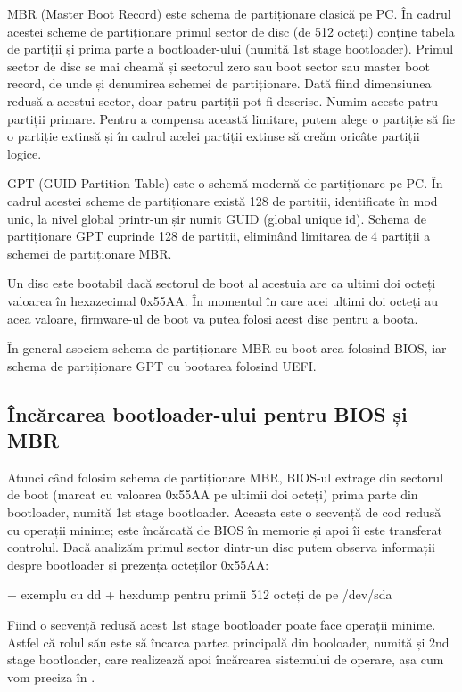MBR (Master Boot Record) este schema de partiționare clasică pe PC. În cadrul
acestei scheme de partiționare primul sector de disc (de 512 octeți) conține
tabela de partiții și prima parte a bootloader-ului (numită 1st stage
bootloader). Primul sector de disc se mai cheamă și sectorul zero sau boot
sector sau master boot record, de unde și denumirea schemei de partiționare.
Dată fiind dimensiunea redusă a acestui sector, doar patru partiții pot fi
descrise. Numim aceste patru partiții primare. Pentru a compensa această
limitare, putem alege o partiție să fie o partiție extinsă și în cadrul acelei
partiții extinse să creăm oricâte partiții logice.

GPT (GUID Partition Table) este o schemă modernă de partiționare pe PC. În
cadrul acestei scheme de partiționare există 128 de partiții, identificate în
mod unic, la nivel global printr-un șir numit GUID (global unique id). Schema de
partiționare GPT cuprinde 128 de partiții, eliminând limitarea de 4 partiții a
schemei de partiționare MBR.

Un disc este bootabil dacă sectorul de boot al acestuia are ca ultimi doi octeți
valoarea în hexazecimal 0x55AA. În momentul în care acei ultimi doi octeți au
acea valoare, firmware-ul de boot va putea folosi acest disc pentru a boota.

În general asociem schema de partiționare MBR cu boot-area folosind BIOS, iar
schema de partiționare GPT cu bootarea folosind UEFI.

\subsection{Încărcarea bootloader-ului pentru BIOS și MBR}
\label{sec:boot-bootdev-bootmbr}

Atunci când folosim schema de partiționare MBR, BIOS-ul extrage din sectorul de
boot (marcat cu valoarea 0x55AA pe ultimii doi octeți) prima parte din
bootloader, numită 1st stage bootloader. Aceasta este o secvență de cod redusă
cu operații minime; este încărcată de BIOS în memorie și apoi îi este transferat
controlul. Dacă analizăm primul sector dintr-un disc putem observa informații
despre bootloader și prezența octeților 0x55AA:

+ exemplu cu dd + hexdump pentru primii 512 octeți de pe /dev/sda

Fiind o secvență redusă acest 1st stage bootloader poate face operații minime.
Astfel că rolul său este să încarca partea principală din booloader, numită și
2nd stage bootloader, care realizează apoi încărcarea sistemului de operare, așa
cum vom preciza în .

